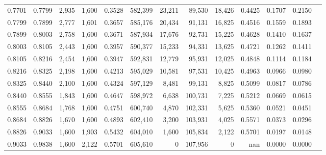 \begin{tabular}{rrrrrrrrrrrrr}
0.7701 & 0.7799 &  2,935 & 1,600 &                                     0.3528 & 582,399 &  23,211 &  89,530 &  18,426 & 0.4425 & 0.1707 & 0.2150 \\
0.7799 & 0.7899 &  2,777 & 1,601 &                                     0.3657 & 585,176 &  20,434 &  91,131 &  16,825 & 0.4516 & 0.1559 & 0.1893 \\
0.7899 & 0.8003 &  2,758 & 1,600 &                                     0.3671 & 587,934 &  17,676 &  92,731 &  15,225 & 0.4628 & 0.1410 & 0.1637 \\
0.8003 & 0.8105 &  2,443 & 1,600 &                                     0.3957 & 590,377 &  15,233 &  94,331 &  13,625 & 0.4721 & 0.1262 & 0.1411 \\
0.8105 & 0.8216 &  2,454 & 1,600 &                                     0.3947 & 592,831 &  12,779 &  95,931 &  12,025 & 0.4848 & 0.1114 & 0.1184 \\
0.8216 & 0.8325 &  2,198 & 1,600 &                                     0.4213 & 595,029 &  10,581 &  97,531 &  10,425 & 0.4963 & 0.0966 & 0.0980 \\
0.8325 & 0.8440 &  2,100 & 1,600 &                                     0.4324 & 597,129 &   8,481 &  99,131 &   8,825 & 0.5099 & 0.0817 & 0.0786 \\
0.8440 & 0.8555 &  1,843 & 1,600 &                                     0.4647 & 598,972 &   6,638 & 100,731 &   7,225 & 0.5212 & 0.0669 & 0.0615 \\
0.8555 & 0.8684 &  1,768 & 1,600 &                                     0.4751 & 600,740 &   4,870 & 102,331 &   5,625 & 0.5360 & 0.0521 & 0.0451 \\
0.8684 & 0.8826 &  1,670 & 1,600 &                                     0.4893 & 602,410 &   3,200 & 103,931 &   4,025 & 0.5571 & 0.0373 & 0.0296 \\
0.8826 & 0.9033 &  1,600 & 1,903 &                                     0.5432 & 604,010 &   1,600 & 105,834 &   2,122 & 0.5701 & 0.0197 & 0.0148 \\
0.9033 & 0.9838 &  1,600 & 2,122 &                                     0.5701 & 605,610 &       0 & 107,956 &       0 &    nan & 0.0000 & 0.0000 \\
\bottomrule
\end{tabular}
